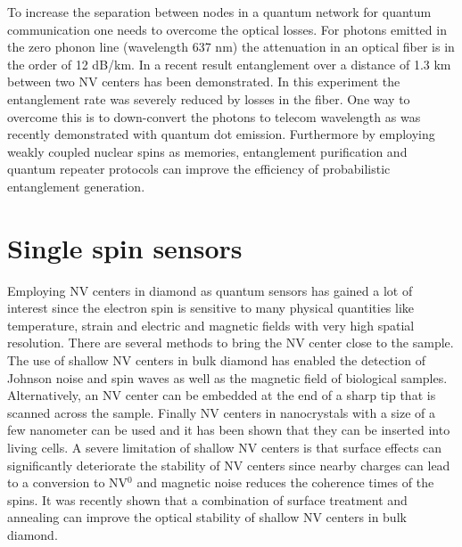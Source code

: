 To increase the separation between nodes in a quantum network for quantum communication one needs to overcome the optical losses. For photons emitted in the zero phonon line (wavelength 637 nm) the attenuation in an optical fiber is in the order of 12 dB/km. In a recent result entanglement over a distance of 1.3 km between two NV centers has been demonstrated\cite{Hensen_Nature_2015}. In this experiment the entanglement rate was severely reduced by losses in the fiber. One way to overcome this is to down-convert the photons to telecom wavelength as was recently demonstrated with quantum dot emission\cite{DeGreve_Nature_2012,Zaske_Phys.Rev.Lett._2012}. Furthermore by employing weakly coupled nuclear spins as memories, entanglement purification\cite{Campbell_Phys.Rev.Lett._2008} and quantum repeater protocols\cite{Briegel_Phys.Rev.Lett._1998} can improve the efficiency of probabilistic entanglement generation.

\section{Single spin sensors}
Employing NV centers in diamond as quantum sensors \cite{Taylor_NatPhys_2008,Schirhagl__2014} has gained a lot of interest since the electron spin is sensitive to many physical quantities like temperature\cite{Acosta_Phys.Rev.Lett._2010,Toyli_PNAS_2013}, strain\cite{Ovartchaiyapong_NatCommun_2014} and electric and magnetic fields\cite{Taylor_NatPhys_2008,Dolde_NatPhys_2011} with very high spatial resolution. There are several methods to bring the NV center close to the sample. The use of shallow NV centers in bulk diamond has enabled the detection of Johnson noise\cite{Kolkowitz_Science_2015} and spin waves\cite{vanderSar_NatCommun_2015} as well as the magnetic field of biological samples\cite{LeSage_Nature_2013}. Alternatively, an NV center can be embedded at the end of a sharp tip that is scanned across the sample\cite{Balasubramanian_Nature_2008,Maletinsky_NatNano_2012,Rondin__2012,Pelliccione_Phys.Rev.Applied_2014,Haberle_NatNano_2015}. Finally NV centers in  nanocrystals with a size of a few nanometer can be used and it has been shown that they can be inserted into living cells\cite{Kucsko_Nature_2013}. A severe limitation of shallow NV centers is that surface effects can significantly deteriorate the stability of NV centers since nearby charges can lead to a conversion to NV$^0$ and magnetic noise reduces the coherence times of the spins. It was recently shown that a combination of surface treatment and annealing can improve the optical stability of shallow NV centers in bulk diamond\cite{Chu_NanoLett._2014}.

